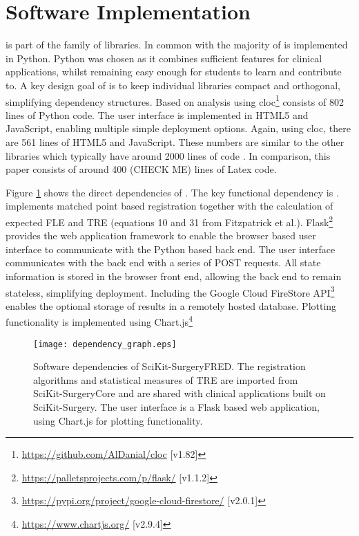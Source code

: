 \section{Software Implementation}
\fred is part of the \sksurgery\cite{PMID:32436132} family of libraries. In common with \sksurgery the majority of \fred is implemented in Python. Python was chosen as it combines sufficient features for clinical
applications, whilst remaining easy enough for students to learn and contribute to. A key design goal of 
\sksurgery is to keep individual libraries compact and orthogonal\cite{pragmaticprog}, simplifying dependency structures. Based on 
analysis using cloc\footnote{\href{https://github.com/AlDanial/cloc}{https://github.com/AlDanial/cloc} [v1.82]} \fred consists of 802 lines of Python 
code. The user interface is implemented in HTML5 and JavaScript, enabling multiple simple deployment 
options. Again, using cloc, there are 561 lines of HTML5 and JavaScript. These numbers are similar to the other \sksurgery libraries which typically have around 2000 lines of code \cite{PMID:32436132}. In comparison, this paper consists of around 400 (CHECK ME) lines of Latex code.

Figure \ref{fig:dependencies} shows the direct dependencies of \fred. The key functional dependency is
\core\cite{matt_clarkson_2020_3965731}. \core implements matched point based registration \cite{Arun1987} together 
with the calculation of expected \gls{FLE} and \gls{TRE} (equations 10 and 31 from Fitzpatrick et al.\cite{Fitzpatrick1998}). Flask\footnote{\href{https://palletsprojects.com/p/flask/}{https://palletsprojects.com/p/flask/}  [v1.1.2]} provides the web application framework 
to enable the browser based user interface to communicate with the Python based back end. The user
interface communicates with the back end with a series of {POST} requests. All state information is stored in the 
browser front end, allowing the back end to remain stateless, simplifying deployment. 
Including the Google Cloud FireStore API\footnote{\href{https://pypi.org/project/google-cloud-firestore/}{https://pypi.org/project/google-cloud-firestore/} [v2.0.1]} 
enables the optional storage of results in a remotely hosted database. Plotting functionality is implemented
using Chart.js\footnote{\href{https://www.chartjs.org/}{https://www.chartjs.org/} [v2.9.4]}

\begin{figure}
	\begin{center}
	\texttt{[image: dependency\_graph.eps]}
		\caption{\label{fig:dependencies}Software dependencies of SciKit-SurgeryFRED. The registration algorithms and statistical measures of {TRE} are imported from SciKit-SurgeryCore and are shared with clinical applications built on SciKit-Surgery. The user interface is a Flask based web application, using Chart.js for plotting functionality.}
	\end{center}
\end{figure}

